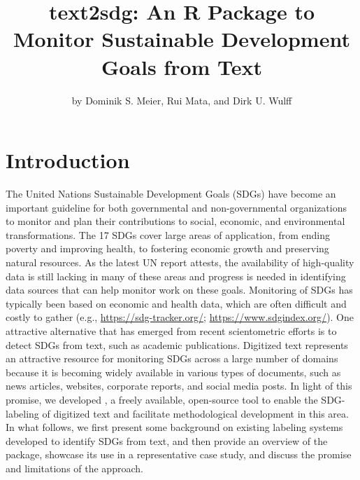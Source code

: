 

\title{text2sdg: An R Package to Monitor Sustainable Development Goals from Text}
\author{by Dominik S. Meier, Rui Mata, and Dirk U. Wulff}

\maketitle


\section{Introduction}

The United Nations Sustainable Development Goals (SDGs) have become an important guideline for both governmental and non-governmental organizations to monitor and plan their contributions to social, economic, and environmental transformations. The 17 SDGs cover large areas of application, from ending poverty and improving health, to fostering economic growth and preserving natural resources. As the latest UN report \cite[]{SGD_report2022} attests, the availability of high-quality data is still lacking in many of these areas and progress is needed in identifying data sources that can help monitor work on these goals. Monitoring of SDGs has typically been based on economic and health data, which are often difficult and costly to gather (e.g., \url{https://sdg-tracker.org/}; \url{https://www.sdgindex.org/}). One attractive alternative that has emerged from recent scientometric efforts is to detect SDGs from text, such as academic publications. Digitized text represents an attractive resource for monitoring SDGs across a large number of domains because it is becoming widely available in various types of documents, such as news articles, websites, corporate reports, and social media posts. In light of this promise, we developed , a freely available, open-source tool to enable the SDG-labeling of digitized text and facilitate methodological development in this area. In what follows, we first present some background on existing labeling systems developed to identify SDGs from text, and then provide an overview of the  package, showcase its use in a representative case study, and discuss the promise and limitations of the approach. 

